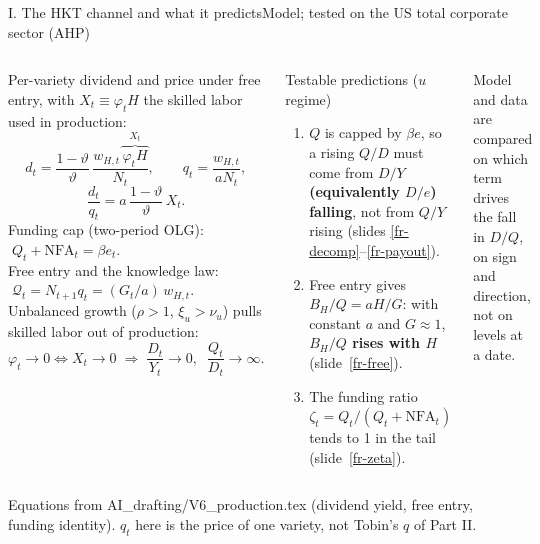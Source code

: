 \documentclass[aspectratio=169,10pt,t]{beamer}
\newcommand{\src}[1]{\vfill{\tiny\textcolor{muted}{#1}\par}\vspace{0.04cm}}
\newcommand{\Qc}{\mathcal Q}
\newcommand{\slref}[1]{slide~\ref{#1}}
\begin{document}
\begin{frame}[label=fr-hkt]{I. The HKT channel and what it predicts}{Model; tested on the US total corporate sector (AHP)}
\begin{columns}[T]
\setlength{\abovedisplayskip}{2pt}\setlength{\belowdisplayskip}{2pt}\setlength{\abovedisplayshortskip}{1pt}\setlength{\belowdisplayshortskip}{1pt}
{\small Per-variety dividend and price under free entry, with $X_t\equiv\varphi_tH$ the skilled labor used in production:}
\[
d_t=\frac{1-\vartheta}{\vartheta}\,\frac{w_{H,t}\,\overbrace{\varphi_tH}^{X_t}}{N_t},\qquad q_t=\frac{w_{H,t}}{aN_t},
\]
\[
\frac{d_t}{q_t}=a\,\frac{1-\vartheta}{\vartheta}\,X_t .
\]
{\small Funding cap (two-period OLG): $\;Q_t+\mathrm{NFA}_t=\beta e_t$.}\\[0.05cm]
{\small Free entry and the knowledge law: $\;\Qc_t=N_{t+1}q_t=(G_t/a)\,w_{H,t}$.}\\[0.1cm]
{\small Unbalanced growth ($\rho>1$, $\xi_u>\nu_u$) pulls skilled labor out of production:}
\[
\varphi_t\to0\iff X_t\to0\;\Longrightarrow\; \frac{D_t}{Y_t}\to0,\;\; \frac{Q_t}{D_t}\to\infty .
\]
\begin{block}{Testable predictions ($u$ regime)}
\small
\begin{enumerate}\setlength{\itemsep}{0.08cm}
\item $Q$ is capped by $\beta e$, so a rising $Q/D$ must come from \textbf{$D/Y$ (equivalently $D/e$) falling}, not from $Q/Y$ rising (slides \ref{fr-decomp}--\ref{fr-payout}).
\item Free entry gives $B_H/Q=aH/G$: with constant $a$ and $G\approx1$, \textbf{$B_H/Q$ rises with $H$} (\slref{fr-free}).
\item The funding ratio $\zeta_t=Q_t/(Q_t+\mathrm{NFA}_t)$ tends to 1 in the tail (\slref{fr-zeta}).
\end{enumerate}
\end{block}
\vspace{0.05cm}
{\scriptsize Model and data are compared on which term drives the fall in $D/Q$, on sign and direction, not on levels at a date.\par}
\end{columns}
\src{Equations from AI\_drafting/V6\_production.tex (dividend yield, free entry, funding identity). $q_t$ here is the price of one variety, not Tobin's $q$ of Part II.}
\end{frame}
\end{document}
